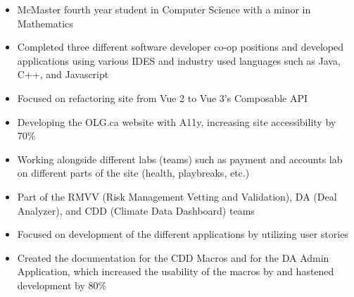 \documentclass[10pt,a4paper,ragged2e,withhyper,darkmode]{altacv}
\begin{document}
    
    \makecvheader
    \begin{paracol}{1}
        \begin{itemize}
                \item {McMaster fourth year student in Computer Science with a minor in Mathematics}
                \item {Completed three different software developer co-op positions and developed applications using various IDES and industry used languages such as Java, C++, and Javascript}
            \end{itemize}
            \begin{itemize}
                \item{Focused on refactoring site from Vue 2 to Vue 3's Composable API}
                \item{Developing the OLG.ca website with A11y, increasing site accessibility by 70\%}
                \item{Working alongside different labs (teams) such as payment and accounts lab on different parts of the site (health, playbreaks, etc.)}
            \end{itemize}
            \begin{itemize}
                \item{Part of the RMVV (Risk Management Vetting and Validation), DA (Deal Analyzer), and CDD (Climate Data Dashboard) teams}
                \item{Focused on development of the different applications by utilizing user stories}
                \item{Created the documentation for the CDD Macros and for the DA Admin Application, which increased the usability of the macros by and hastened development by 80\%}

\end{itemize}
\end{paracol}
\end{document}
